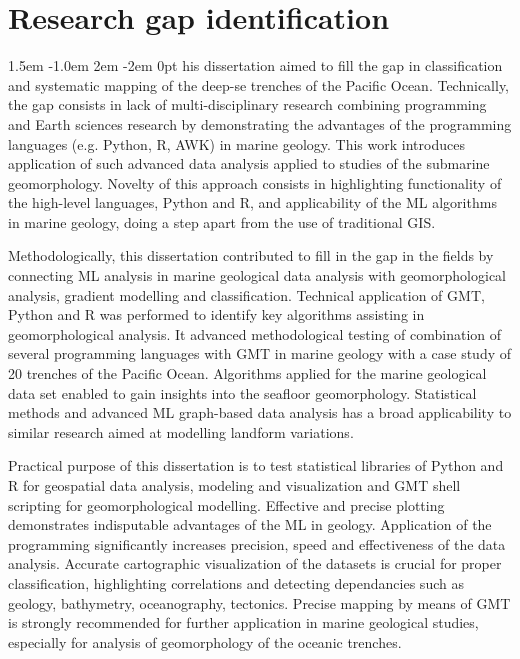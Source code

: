 \documentclass[11pt,a4paper]{report}
\def\pstart#1{\noindent\smash{\lower1.5ex\hbox{\llap{\Cal#1}}\hskip-.1ex}
  \parshape=3 1.5em \dimexpr\hsize-1.0em 2em \dimexpr\hsize-2em 0pt \hsize}
\begin{document}
\pagebreak	
\section{Research gap identification}
\pstart This dissertation aimed to fill the gap in classification and systematic mapping of the deep-se trenches of the Pacific Ocean. Technically, the gap consists in lack of multi-disciplinary research combining programming and Earth sciences research by demonstrating the advantages of the programming languages (e.g. Python, R, AWK) in marine geology. This work introduces application of such advanced data analysis applied to studies of the submarine geomorphology. Novelty of this approach consists in highlighting functionality of the high-level languages, Python and R, and applicability of the \ac{ML} algorithms in marine geology, doing a step apart from the use of traditional \ac{GIS}. 

Methodologically, this dissertation contributed to fill in the gap in the fields by connecting \ac{ML} analysis in marine geological data analysis with geomorphological analysis, gradient modelling and classification. Technical application of \ac{GMT}, Python and R was performed to identify key algorithms assisting in geomorphological analysis. It advanced methodological testing of combination of several programming languages with \ac{GMT} in marine geology with a case study of 20 trenches of the Pacific Ocean. Algorithms applied for the marine geological data set enabled to gain insights into the seafloor geomorphology. Statistical methods and advanced \ac{ML} graph-based data analysis has a broad applicability to similar research aimed at modelling landform variations.  

Practical purpose of this dissertation is to test statistical libraries of Python and R for geospatial data analysis, modeling and visualization and \ac{GMT} shell scripting for geomorphological modelling. Effective and precise plotting demonstrates indisputable advantages of the \ac{ML} in geology. Application of the programming significantly increases precision, speed and effectiveness of the data analysis. Accurate cartographic visualization of the datasets is crucial for proper classification, highlighting correlations and detecting dependancies such as geology, bathymetry, oceanography, tectonics. Precise mapping by means of \ac{GMT} is strongly recommended for further application in marine geological studies, especially for analysis of geomorphology of the oceanic trenches. 
\end{document}
